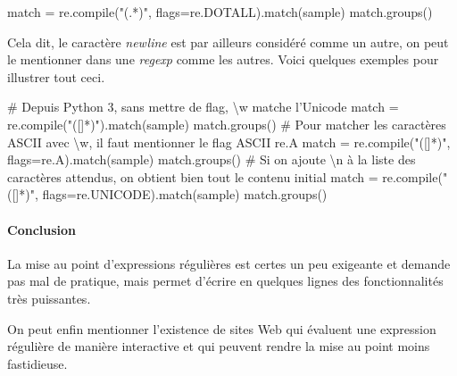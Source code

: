 \begin{idleconsole}
	\begin{pyconsole}
match = re.compile("(.*)", flags=re.DOTALL).match(sample)
match.groups()
\end{pyconsole}
\end{idleconsole}

Cela dit, le caractère \textit{newline} est par ailleurs considéré comme un autre, on peut le mentionner dans une \textit{regexp} comme les autres. Voici quelques exemples pour illustrer tout ceci.

\begin{idleconsole*}
	\begin{pyconsole}
# Depuis Python 3, sans mettre de flag, \textbackslash{w} matche l'Unicode
match = re.compile("([\w ]*)").match(sample)
match.groups()
# Pour matcher les caractères ASCII avec \textbackslash{w}, il faut mentionner le flag ASCII re.A
match = re.compile("([\w ]*)", flags=re.A).match(sample)
match.groups()
# Si on ajoute \textbackslash{n} à la liste des caractères attendus, on obtient bien tout le contenu initial
match = re.compile("([\w \n]*)", flags=re.UNICODE).match(sample)
match.groups()
	\end{pyconsole}
\end{idleconsole*}

\vspace{1pt}

\paragraph{Conclusion}
La mise au point d'expressions régulières est certes un peu exigeante et demande pas mal de pratique, mais permet d'écrire en quelques lignes des fonctionnalités très puissantes.

On peut enfin mentionner l'existence de sites Web qui évaluent une expression régulière de manière interactive et qui peuvent rendre la mise au point moins fastidieuse.



